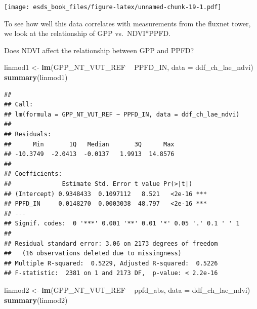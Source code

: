 \documentclass[
]{book}
\newenvironment{Shaded}{\begin{snugshade}}{\end{snugshade}}
\newcommand{\DataTypeTok}[1]{\textcolor[rgb]{0.13,0.29,0.53}{#1}}
\newcommand{\KeywordTok}[1]{\textcolor[rgb]{0.13,0.29,0.53}{\textbf{#1}}}
\newcommand{\NormalTok}[1]{#1}
\newcommand{\OperatorTok}[1]{\textcolor[rgb]{0.81,0.36,0.00}{\textbf{#1}}}
\newcommand{\StringTok}[1]{\textcolor[rgb]{0.31,0.60,0.02}{#1}}
\begin{document}
\texttt{[image: esds\_book\_files/figure-latex/unnamed-chunk-19-1.pdf]}

To see how well this data correlates with measurements from the fluxnet tower, we look at the relationship of GPP vs.~NDVI*PPFD.

\begin{Shaded}
\end{Shaded}

Does NDVI affect the relationship between GPP and PPFD?

\begin{Shaded}
\begin{Highlighting}[]
\NormalTok{linmod1 <-}\StringTok{ }\KeywordTok{lm}\NormalTok{(GPP_NT_VUT_REF }\OperatorTok{~}\StringTok{ }\NormalTok{PPFD_IN, }\DataTypeTok{data =}\NormalTok{ ddf_ch_lae_ndvi)}
\KeywordTok{summary}\NormalTok{(linmod1)}
\end{Highlighting}
\end{Shaded}

\begin{verbatim}
## 
## Call:
## lm(formula = GPP_NT_VUT_REF ~ PPFD_IN, data = ddf_ch_lae_ndvi)
## 
## Residuals:
##      Min       1Q   Median       3Q      Max 
## -10.3749  -2.0413  -0.0137   1.9913  14.8576 
## 
## Coefficients:
##              Estimate Std. Error t value Pr(>|t|)    
## (Intercept) 0.9348433  0.1097112   8.521   <2e-16 ***
## PPFD_IN     0.0148270  0.0003038  48.797   <2e-16 ***
## ---
## Signif. codes:  0 '***' 0.001 '**' 0.01 '*' 0.05 '.' 0.1 ' ' 1
## 
## Residual standard error: 3.06 on 2173 degrees of freedom
##   (16 observations deleted due to missingness)
## Multiple R-squared:  0.5229, Adjusted R-squared:  0.5226 
## F-statistic:  2381 on 1 and 2173 DF,  p-value: < 2.2e-16
\end{verbatim}

\begin{Shaded}
\begin{Highlighting}[]
\NormalTok{linmod2 <-}\StringTok{ }\KeywordTok{lm}\NormalTok{(GPP_NT_VUT_REF }\OperatorTok{~}\StringTok{ }\NormalTok{ppfd_abs, }\DataTypeTok{data =}\NormalTok{ ddf_ch_lae_ndvi)}
\KeywordTok{summary}\NormalTok{(linmod2)}
\end{Highlighting}
\end{Shaded}
\end{document}
